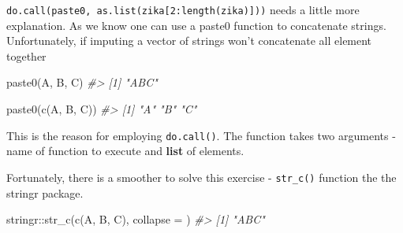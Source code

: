 \documentclass[
]{book}
\newenvironment{Shaded}{\begin{snugshade}}{\end{snugshade}}
\newcommand{\AttributeTok}[1]{\textcolor[rgb]{0.77,0.63,0.00}{#1}}
\newcommand{\CommentTok}[1]{\textcolor[rgb]{0.56,0.35,0.01}{\textit{#1}}}
\newcommand{\DecValTok}[1]{\textcolor[rgb]{0.00,0.00,0.81}{#1}}
\newcommand{\FunctionTok}[1]{\textcolor[rgb]{0.00,0.00,0.00}{#1}}
\newcommand{\NormalTok}[1]{#1}
\newcommand{\SpecialCharTok}[1]{\textcolor[rgb]{0.00,0.00,0.00}{#1}}
\newcommand{\StringTok}[1]{\textcolor[rgb]{0.31,0.60,0.02}{#1}}
\begin{document}
\texttt{do.call(paste0,\ as.list(zika{[}2:length(zika){]}))} needs a little more explanation. As we know one can use a paste0 function to concatenate strings. Unfortunately, if imputing a vector of strings won't concatenate all element together

\begin{Shaded}
\begin{Highlighting}[]
\FunctionTok{paste0}\NormalTok{(}\StringTok{\textquotesingle{}A\textquotesingle{}}\NormalTok{, }\StringTok{\textquotesingle{}B\textquotesingle{}}\NormalTok{, }\StringTok{\textquotesingle{}C\textquotesingle{}}\NormalTok{)}
\CommentTok{\#\textgreater{} [1] "ABC"}

\FunctionTok{paste0}\NormalTok{(}\FunctionTok{c}\NormalTok{(}\StringTok{\textquotesingle{}A\textquotesingle{}}\NormalTok{, }\StringTok{\textquotesingle{}B\textquotesingle{}}\NormalTok{, }\StringTok{\textquotesingle{}C\textquotesingle{}}\NormalTok{))}
\CommentTok{\#\textgreater{} [1] "A" "B" "C"}
\end{Highlighting}
\end{Shaded}

This is the reason for employing \texttt{do.call()}. The function takes two arguments - name of function to execute and \textbf{list} of elements.

Fortunately, there is a smoother to solve this exercise - \texttt{str\_c()} function the the stringr package.

\begin{Shaded}
\begin{Highlighting}[]
\NormalTok{stringr}\SpecialCharTok{::}\FunctionTok{str\_c}\NormalTok{(}\FunctionTok{c}\NormalTok{(}\StringTok{\textquotesingle{}A\textquotesingle{}}\NormalTok{, }\StringTok{\textquotesingle{}B\textquotesingle{}}\NormalTok{, }\StringTok{\textquotesingle{}C\textquotesingle{}}\NormalTok{), }\AttributeTok{collapse =} \StringTok{\textquotesingle{}\textquotesingle{}}\NormalTok{)}
\CommentTok{\#\textgreater{} [1] "ABC"}
\end{Highlighting}
\end{Shaded}

\begin{Shaded}
\end{Shaded}
\end{document}

